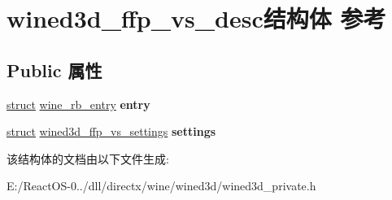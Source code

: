 \hypertarget{structwined3d__ffp__vs__desc}{}\section{wined3d\+\_\+ffp\+\_\+vs\+\_\+desc结构体 参考}
\label{structwined3d__ffp__vs__desc}
\subsection*{Public 属性}
\begin{DoxyCompactItemize}
\item 
\mbox{\label{structwined3d__ffp__vs__desc_a1350c2607b4212ea5af083c24ea7a570}} 
\hyperlink{interfacestruct}{struct} \hyperlink{structwine__rb__entry}{wine\+\_\+rb\+\_\+entry} {\bfseries entry}
\item 
\mbox{\label{structwined3d__ffp__vs__desc_a16e68d73a99cd42b3421c517eceb11d8}} 
\hyperlink{interfacestruct}{struct} \hyperlink{structwined3d__ffp__vs__settings}{wined3d\+\_\+ffp\+\_\+vs\+\_\+settings} {\bfseries settings}
\end{DoxyCompactItemize}


该结构体的文档由以下文件生成\+:\begin{DoxyCompactItemize}
\item 
E\+:/\+React\+O\+S-\/0../dll/directx/wine/wined3d/wined3d\+\_\+private.\+h\end{DoxyCompactItemize}
